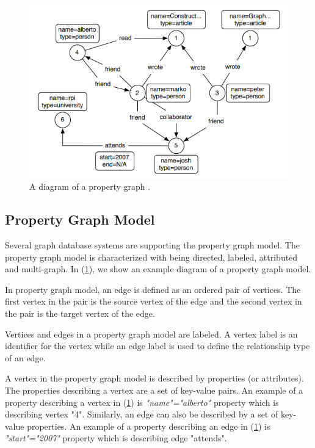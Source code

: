 {\begin{figure}[H]
\centering
\includegraphics[width=17cm]{pics/PGM.png}
\caption{A diagram of a property graph \cite{DBLP:journals/corr/abs-1006-2361}.}
\label{fig:PGM}
\end{figure} 

\subsection{Property Graph Model}
\label{subsec:PGM}

Several graph database systems are supporting the property graph model. The property graph model is characterized with being directed, labeled, attributed and multi-graph. In (\ref{fig:PGM}), we show an example diagram of a property graph model. 

In property graph model, an edge is defined as an ordered pair of vertices. The first vertex in the pair is the source vertex of the edge and the second vertex in the pair is the target vertex of the edge. 

Vertices and edges in a property graph model are labeled. A vertex label is an identifier for the vertex while an edge label is used to define the relationship type of an edge. 

A vertex in the property graph model is described by properties (or attributes). The properties describing a vertex are a set of key-value pairs. An example of a property describing a vertex in (\ref{fig:PGM}) is \textit{"name"="alberto"} property which is describing vertex "4". Similarly, an edge can also be described by a set of key-value properties. An example of a property describing an edge in (\ref{fig:PGM}) is \textit{"start"="2007"} property which is describing edge "attends".

}

